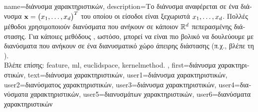 {name={\foreignlanguage{greek}{διάνυσμα χαρακτηριστικών}},
	description={\foreignlanguage{greek}{Το διάνυσμα}  
		\foreignlanguage{greek}{αναφέρεται σε ένα διάνυσμα ${\bf x} = \big(x_{1},\ldots,x_{d}\big)^{T}$ 
		του οποίου οι είσοδοι είναι ξεχωριστά}  $x_{1},\ldots,x_{d}$. 
		\foreignlanguage{greek}{Πολλές μέθοδοι}  \foreignlanguage{greek}{χρησιμοποιούν διανύσματα} 
		 \foreignlanguage{greek}{που ανήκουν σε κάποιον}  $\mathbb{R}^{d}$
		\foreignlanguage{greek}{πεπερασμένης διάστασης. Για κάποιες μεθόδους} 
		, \foreignlanguage{greek}{ωστόσο, μπορεί να είναι πιο βολικό να δουλεύουμε με διανύσματα}  
		\foreignlanguage{greek}{που ανήκουν σε ένα διανυσματικό χώρο άπειρης διάστασης (π.χ., βλέπε τη} ).\\
	\foreignlanguage{greek}{Βλέπε επίσης:} \gls{feature}, \gls{ml}, \gls{euclidspace}, \gls{kernelmethod}.
		}, first={\foreignlanguage{greek}{διάνυσμα χαρακτηριστικών}},
		text={\foreignlanguage{greek}{διάνυσμα χαρακτηριστικών}},
		user1={\foreignlanguage{greek}{διάνυσμα χαρακτηριστικών}}, %
  		user2={\foreignlanguage{greek}{διανύσματος χαρακτηριστικών}}, %
		user3={\foreignlanguage{greek}{διάνυσμα χαρακτηριστικών}}, %
		user4={\foreignlanguage{greek}{διανύσματα χαρακτηριστικών}}, %
  		user5={\foreignlanguage{greek}{διανυσμάτων χαρακτηριστικών}}, %
		user6={\foreignlanguage{greek}{διανύσματα χαρακτηριστικών}} %
}

